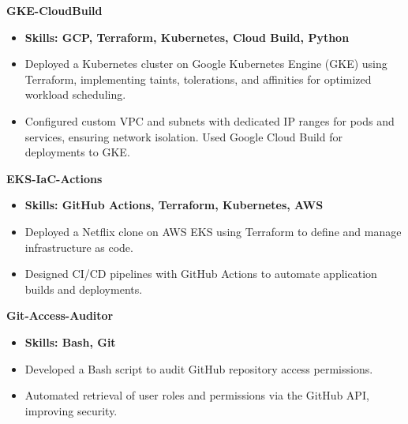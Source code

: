 \documentclass[11pt,a4paper]{article}
\newenvironment{dashlist}{
  \begin{itemize}[label={--}]
}{
  \end{itemize}
}
\begin{document}
\noindent\textbf{GKE-CloudBuild}
\begin{itemize}
\item \textbf{Skills: GCP, Terraform, Kubernetes, Cloud Build, Python}
\end{itemize}
\begin{dashlist}
    \item Deployed a Kubernetes cluster on Google Kubernetes Engine (GKE) using Terraform, implementing taints, tolerations, and affinities for optimized workload scheduling.
    \item Configured custom VPC and subnets with dedicated IP ranges for pods and services, ensuring network isolation. Used Google Cloud Build for deployments to GKE.
\end{dashlist}
\vspace{0.5em}

\noindent\textbf{EKS-IaC-Actions}
\begin{itemize}
\item \textbf{Skills: GitHub Actions, Terraform, Kubernetes, AWS}
\end{itemize}
\begin{dashlist}
    \item Deployed a Netflix clone on AWS EKS using Terraform to define and manage infrastructure as code.
    \item Designed CI/CD pipelines with GitHub Actions to automate application builds and deployments.
\end{dashlist}
\vspace{0.5em}

\noindent\textbf{Git-Access-Auditor}
\begin{itemize}
\item \textbf{Skills: Bash, Git}
\end{itemize}
\begin{dashlist}
    \item Developed a Bash script to audit GitHub repository access permissions.
    \item Automated retrieval of user roles and permissions via the GitHub API, improving security.
\end{dashlist}
\end{document}
